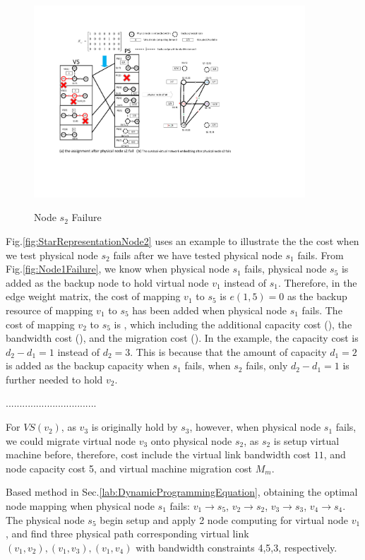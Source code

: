 \begin{figure}
\centering
\includegraphics[width=4in]{Fig/Node2Failure}\\
  \caption{Node $s_2$ Failure}\label{fig:Node2Failure}
\end{figure}



Fig.\ref{fig:StarRepresentationNode2} uses an example to illustrate the the cost when we test physical node $s_2$ fails after we have tested physical node $s_1$ fails. From Fig.\ref{fig:Node1Failure}, we know when physical node $s_1$ fails, physical node $s_5$ is added as the backup node to hold virtual node $v_1$ instead of $s_1$. Therefore, in the  edge weight matrix, the cost of mapping $v_1$ to $s_5$ is  $e(1,5)=0$ as the backup resource of mapping $v_1$ to $s_5$ has been added when physical node $s_1$ fails. The cost of mapping $v_2$ to $s_5$ is , which including the additional capacity cost (), the bandwidth cost (), and the migration cost (). In the example, the capacity cost is $d_2-d_1=1$ instead of $d_2=3$. This is because that the amount of capacity $d_1=2$ is added as the backup capacity when $s_1$ fails, when $s_2$ fails, only $d_2-d_1=1$ is further needed to hold $v_2$.


.................................


For $VS(v_2)$, as $v_3$ is originally hold by $s_3$, however, when physical node $s_1$ fails, we could migrate virtual node $v_3$ onto physical node $s_2$, as $s_2$ is setup virtual machine before, therefore, cost include the virtual link bandwidth cost $11$, and node capacity cost 5, and virtual machine migration cost $M_m$.

Based method in Sec.\ref{lab:DynamicProgrammingEquation}, obtaining the optimal node mapping when physical node $s_1$ fails: $v_1 \rightarrow s_5$, $v_2 \rightarrow s_2$, $v_3 \rightarrow s_3$, $v_4 \rightarrow s_4$. The physical node $s_5$ begin setup and apply 2 node computing for virtual node $v_1$, and find three physical path corresponding virtual link $(v_1,v_2),(v_1,v_3),(v_1,v_4)$ with bandwidth constraints 4,5,3, respectively.

